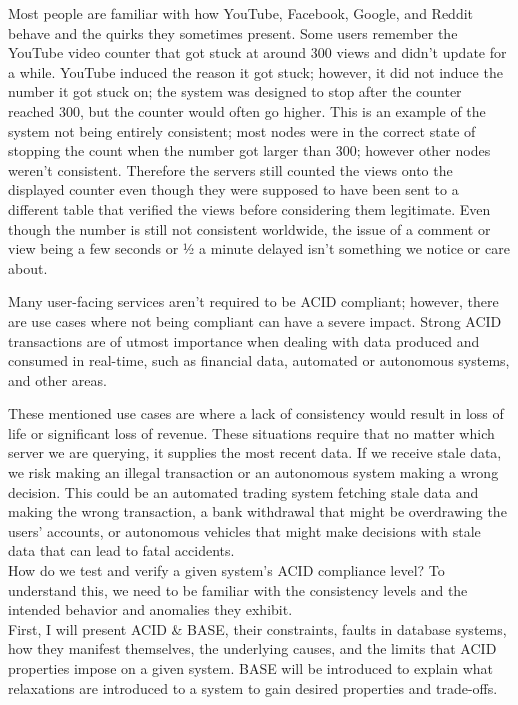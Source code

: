 \documentclass[a4paper,10pt,titlepage]{report}
\begin{document}
    Most people are familiar with how YouTube, Facebook, Google, and Reddit behave and the quirks they sometimes present. Some users remember the YouTube video counter that got stuck at around 300 views and didn't update for a while. YouTube induced the reason it got stuck; however, it did not induce the number it got stuck on; the system was designed to stop after the counter reached 300, but the counter would often go higher. This is an example of the system not being entirely consistent; most nodes were in the correct state of stopping the count when the number got larger than 300; however other nodes weren't consistent. Therefore the servers still counted the views onto the displayed counter even though they were supposed to have been sent to a different table that verified the views before considering them legitimate. Even though the number is still not consistent worldwide, the issue of a comment or view being a few seconds or ½ a minute delayed isn't something we notice or care about.

    Many user-facing services aren't required to be ACID compliant; however, there are use cases where not being compliant can have a severe impact. Strong ACID transactions are of utmost importance when dealing with data produced and consumed in real-time, such as financial data, automated or autonomous systems, and other areas.

    These mentioned use cases are where a lack of consistency would result in loss of life or significant loss of revenue. These situations require that no matter which server we are querying, it supplies the most recent data. If we receive stale data, we risk making an illegal transaction or an autonomous system making a wrong decision. This could be an automated trading system fetching stale data and making the wrong transaction, a bank withdrawal that might be overdrawing the users' accounts, or autonomous vehicles that might make decisions with stale data that can lead to fatal accidents. \\

    \vspace{5mm}
    How do we test and verify a given system's ACID compliance level? To understand this, we need to be familiar with the consistency levels and the intended behavior and anomalies they exhibit.\\


    First, I will present ACID \& BASE, their constraints, faults in database systems, how they manifest themselves, the underlying causes, and the limits that ACID properties impose on a given system. BASE will be introduced to explain what relaxations are introduced to a system to gain desired properties and trade-offs.\\
    \vspace{5mm}
\end{document}
